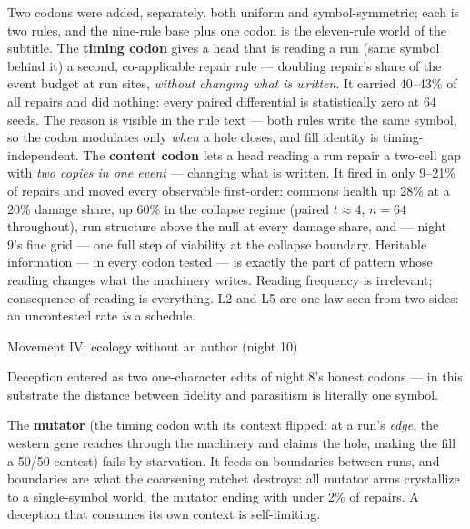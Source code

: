 Two codons were added, separately, both uniform and
symbol-symmetric; each is two rules, and the nine-rule base plus
one codon is the eleven-rule world of the subtitle. The {\bf timing codon} gives a head that is
reading a run (same symbol behind it) a second, co-applicable
repair rule --- doubling repair's share of the event budget at run
sites, {\it without changing what is written}. It carried 40--43\%
of all repairs and did nothing: every paired differential is
statistically zero at 64 seeds. The reason is visible in the rule
text --- both rules write the same symbol, so the codon modulates
only {\it when} a hole closes, and fill identity is
timing-independent. The {\bf content codon} lets a head reading a
run repair a two-cell gap with {\it two copies in one event} ---
changing what is written. It fired in only 9--21\% of repairs and
moved every observable first-order: commons health up 28\% at a
20\% damage share, up 60\% in the collapse regime (paired
$t\approx4$, $n{=}64$ throughout), run structure above the null at
every damage share, and --- night 9's fine grid --- one full step
of viability at the collapse boundary.  Heritable
information --- in every codon tested --- is exactly the part of
pattern whose reading changes what the machinery writes. Reading
frequency is irrelevant; consequence of reading is everything. L2
and L5 are one law seen from two sides: an uncontested rate {\it
is} a schedule.

\sec Movement IV: ecology without an author (night 10)

Deception entered as two one-character edits of night 8's honest
codons --- in this substrate the distance between fidelity and
parasitism is literally one symbol.

The {\bf mutator} (the timing codon with its context flipped: at a
run's {\it edge}, the western gene reaches through the machinery
and claims the hole, making the fill a 50/50 contest) fails by
starvation. It feeds on boundaries between runs, and boundaries
are what the coarsening ratchet destroys: all mutator arms
crystallize to a single-symbol world, the mutator ending with
under 2\% of repairs. A deception that consumes its own context is
self-limiting.

